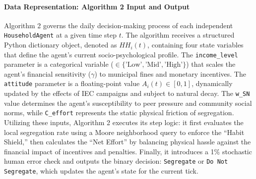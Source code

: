 
\paragraph{Data Representation: Algorithm 2 Input and Output}
Algorithm 2 governs the daily decision-making process of each independent \texttt{HouseholdAgent} at a given time step \(t\). The algorithm receives a structured Python dictionary object, denoted as \(HH_i(t)\), containing four state variables that define the agent's current socio-psychological profile. The \texttt{income\_level} parameter is a categorical variable (\(\in \{\text{'Low'}, \text{'Mid'}, \text{'High'}\}\)) that scales the agent's financial sensitivity (\(\gamma\)) to municipal fines and monetary incentives. The \texttt{attitude} parameter is a floating-point value \(A_i(t) \in [0, 1]\), dynamically updated by the effects of IEC campaigns and subject to natural decay. The \texttt{w\_SN} value determines the agent's susceptibility to peer pressure and community social norms, while \texttt{C\_effort} represents the static physical friction of segregation. Utilizing these inputs, Algorithm 2 executes its step logic: it first evaluates the local segregation rate using a Moore neighborhood query to enforce the ``Habit Shield,'' then calculates the ``Net Effort'' by balancing physical hassle against the financial impact of incentives and penalties. Finally, it introduces a 1\% stochastic human error check and outputs the binary decision: \texttt{Segregate} or \texttt{Do Not Segregate}, which updates the agent's state for the current tick.

